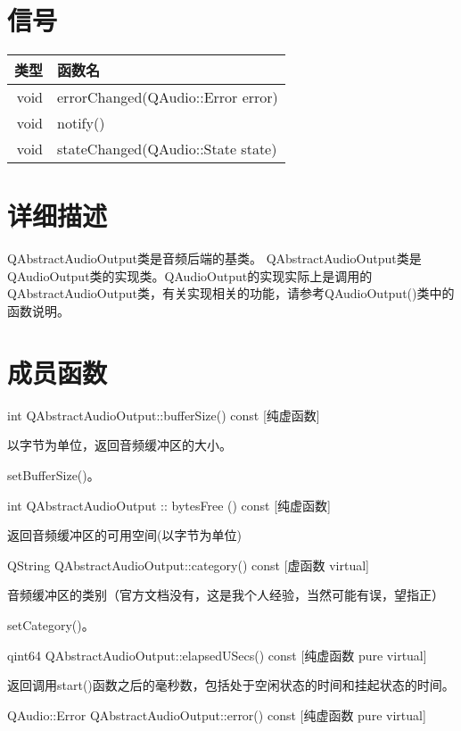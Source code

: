 \section{信号}

\begin{tabular}{|r|l|}
\hline
类型&函数名\\
\hline
void&	errorChanged(QAudio::Error error)\\
\hline
void&	notify()\\
\hline
void&	stateChanged(QAudio::State state)\\
\hline
\end{tabular}

\section{详细描述}

QAbstractAudioOutput类是音频后端的基类。 QAbstractAudioOutput类是
QAudioOutput类的实现类。QAudioOutput的实现实际上是调用的
QAbstractAudioOutput类，有关实现相关的功能，请参考QAudioOutput()类中的
函数说明。

\section{成员函数}

int QAbstractAudioOutput::bufferSize() const [纯虚函数] 

以字节为单位，返回音频缓冲区的大小。


\begin{seeAlso}
setBufferSize()。
\end{seeAlso}

int QAbstractAudioOutput :: bytesFree () const [纯虚函数] 

返回音频缓冲区的可用空间(以字节为单位)

QString QAbstractAudioOutput::category() const [虚函数 virtual] 

音频缓冲区的类别（官方文档没有，这是我个人经验，当然可能有误，望指正） 

\begin{seeAlso}
setCategory()。
\end{seeAlso}

qint64 QAbstractAudioOutput::elapsedUSecs() const [纯虚函数 pure virtual] 

返回调用start()函数之后的毫秒数，包括处于空闲状态的时间和挂起状态的时间。

QAudio::Error QAbstractAudioOutput::error() const [纯虚函数 pure
virtual] 

